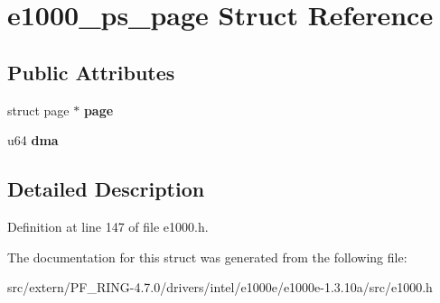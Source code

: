 \hypertarget{structe1000__ps__page}{
\section{e1000\_\-ps\_\-page Struct Reference}
\label{structe1000__ps__page}
}
\subsection*{Public Attributes}
\begin{DoxyCompactItemize}
\item 
\hypertarget{structe1000__ps__page_a108245a46a8fe1680a1b71443222bdbb}{
struct page $\ast$ {\bfseries page}}
\label{structe1000__ps__page_a108245a46a8fe1680a1b71443222bdbb}

\item 
\hypertarget{structe1000__ps__page_af8e000b46948f4023d749416e12a9f2f}{
u64 {\bfseries dma}}
\label{structe1000__ps__page_af8e000b46948f4023d749416e12a9f2f}

\end{DoxyCompactItemize}


\subsection{Detailed Description}


Definition at line 147 of file e1000.h.



The documentation for this struct was generated from the following file:\begin{DoxyCompactItemize}
\item 
src/extern/PF\_\-RING-\/4.7.0/drivers/intel/e1000e/e1000e-\/1.3.10a/src/e1000.h\end{DoxyCompactItemize}
